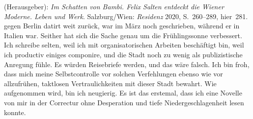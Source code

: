 \begin{ledgroupsized}[t]{13cm}
{{{                     (Herausgeber): \emph{Im Schatten von Bambi. Felix Salten entdeckt die Wiener
                        Moderne. Leben und Werk}.
                     Salzburg/Wien:
                        \emph{Residenz}{ }2020, S. 260–289, hier 281.}}}\label{K_L03422-5h}
               gegen Berlin datirt weit zurück, war im März noch geschrieben, während er in Italien war. Seither hat sich die Sache genau um die
               Frühlingssonne verbessert. Ich schreibe selten, weil ich mit organisatorischen
               Arbeiten beschäftigt bin, weil ich productiv einiges componire, und die Stadt noch zu wenig als
               publizistische Anregung fühle. Es würden Reisebriefe werden, und das wäre falsch. Ich
               bin froh, dass mich meine Selbstcontrolle {\pb}vor solchen Verfehlungen ebenso
               wie vor allzufrühen, taktlosen Vertraulichkeiten mit dieser Stadt bewahrt.\pend
           \pstart
           Wie \label{K_L03422-6v}\label{K_L03422-6h} aufgenommen wird, bin ich
               neugierig. Es ist das erstemal, dass ich eine Novelle von mir in der Correctur ohne
               Desperation und tiefe Niedergeschlagenheit lesen konnte.\pend
           \pstart

\end{ledgroupsized}
